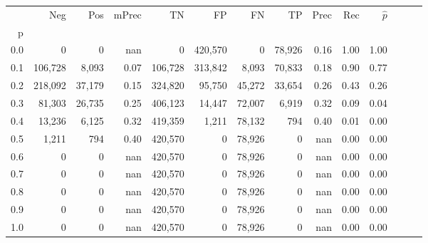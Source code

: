 \begin{tabular}{rrrrrrrrrrrrrr}
\toprule
{} &      Neg &     Pos & mPrec &       TN &       FP &      FN &      TP &  Prec &   Rec & $\hat{p}$ \\
p   &          &         &       &          &          &         &         &       &       &           \\
\midrule
0.0 &        0 &       0 &   nan &        0 &  420,570 &       0 &  78,926 &  0.16 &  1.00 &      1.00 \\
0.1 &  106,728 &   8,093 &  0.07 &  106,728 &  313,842 &   8,093 &  70,833 &  0.18 &  0.90 &      0.77 \\
0.2 &  218,092 &  37,179 &  0.15 &  324,820 &   95,750 &  45,272 &  33,654 &  0.26 &  0.43 &      0.26 \\
0.3 &   81,303 &  26,735 &  0.25 &  406,123 &   14,447 &  72,007 &   6,919 &  0.32 &  0.09 &      0.04 \\
0.4 &   13,236 &   6,125 &  0.32 &  419,359 &    1,211 &  78,132 &     794 &  0.40 &  0.01 &      0.00 \\
0.5 &    1,211 &     794 &  0.40 &  420,570 &        0 &  78,926 &       0 &   nan &  0.00 &      0.00 \\
0.6 &        0 &       0 &   nan &  420,570 &        0 &  78,926 &       0 &   nan &  0.00 &      0.00 \\
0.7 &        0 &       0 &   nan &  420,570 &        0 &  78,926 &       0 &   nan &  0.00 &      0.00 \\
0.8 &        0 &       0 &   nan &  420,570 &        0 &  78,926 &       0 &   nan &  0.00 &      0.00 \\
0.9 &        0 &       0 &   nan &  420,570 &        0 &  78,926 &       0 &   nan &  0.00 &      0.00 \\
1.0 &        0 &       0 &   nan &  420,570 &        0 &  78,926 &       0 &   nan &  0.00 &      0.00 \\
\bottomrule
\end{tabular}
